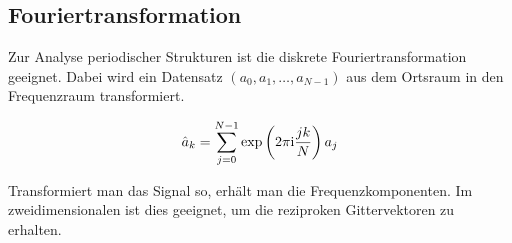 \documentclass[a4paper,german,12pt,smallheadings]{scrartcl}
\begin{document}
\subsection{Fouriertransformation}

Zur Analyse periodischer Strukturen ist die diskrete Fouriertransformation
geeignet. Dabei wird ein Datensatz $(a_0, a_1, \dots, a_{N-1})$ aus dem Ortsraum in
den Frequenzraum transformiert.

\begin{equation}
  \hat{a}_k = \sum_{j=0}^{N-1} \exp\del{2 \pi \text{i} \frac{jk}{N}} a_j
\end{equation}

Transformiert man das Signal so, erhält man die Frequenzkomponenten. Im
zweidimensionalen ist dies geeignet, um die reziproken Gittervektoren zu
erhalten.



\end{document}
